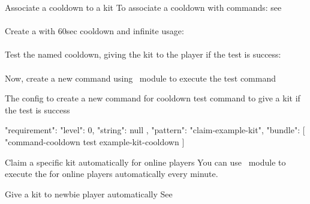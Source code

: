 \begin{example}{Associate a cooldown to a kit}
    To associate a cooldown with commands: see~\\\\
    Create a  with 60sec cooldown and infinite usage: \\\\
    Test the named cooldown, giving the kit to the player if the test is success:\\\\

    Now, create a new command using~ module to execute the test command
    \begin{example}{The config to create a new command for cooldown test command to give a kit if the test is success}
        \begin{jsoncode}
        {
            "requirement": {
            "level": 0,
            "string": null
        },
            "pattern": "claim-example-kit",
            "bundle": [
            "command-cooldown test example-kit-cooldown %
            ]
        }
        \end{jsoncode}
    \end{example}

\end{example}

\begin{example}{Claim a specific kit automatically for online players}
    You can use~ module to execute the  for online players automatically every minute.
\end{example}

\begin{example}{Give a kit to newbie player automatically}
    See~
\end{example}
